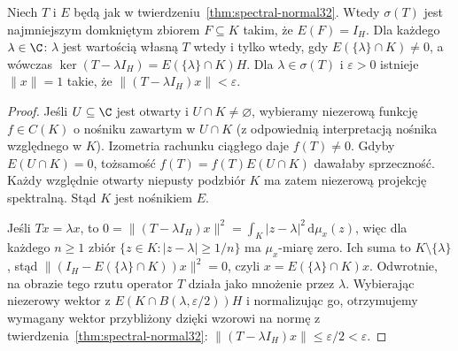\begin{twierdzenie}
\label{thm:spectral-support32}
Niech $T$ i $E$ będą jak w twierdzeniu~\ref{thm:spectral-normal32}.
Wtedy $\sigma(T)$ jest najmniejszym domkniętym zbiorem
$F\subseteq K$ takim, że $E(F)=I_H$.
Dla każdego $\lambda\in\C$:
$\lambda$ jest wartością własną $T$ wtedy i tylko wtedy,
gdy $E(\{\lambda\}\cap K)\ne0$, a wówczas
$\ker(T-\lambda I_H)=E(\{\lambda\}\cap K)H$.
Dla $\lambda\in\sigma(T)$ i $\varepsilon>0$ istnieje
$\|x\|=1$ takie, że $\|(T-\lambda I_H)x\|<\varepsilon$.
\end{twierdzenie}
\begin{proof}
Jeśli $U\subseteq\C$ jest otwarty i $U\cap K\ne\varnothing$,
wybieramy niezerową funkcję $f\in C(K)$ o nośniku
zawartym w $U\cap K$ (z odpowiednią interpretacją
nośnika względnego w $K$).
Izometria rachunku ciągłego daje $f(T)\ne0$.
Gdyby $E(U\cap K)=0$, tożsamość
$f(T)=f(T)E(U\cap K)$ dawałaby sprzeczność.
Każdy względnie otwarty niepusty podzbiór $K$
ma zatem niezerową projekcję spektralną. Stąd
$K$ jest nośnikiem $E$.

Jeśli $Tx=\lambda x$, to
$0=\|(T-\lambda I_H)x\|^2
=\int_K|z-\lambda|^2\,\mathrm d\mu_x(z)$,
więc dla każdego $n\ge1$ zbiór
$\{z\in K:|z-\lambda|\ge1/n\}$ ma $\mu_x$-miarę zero.
Ich suma to $K\setminus\{\lambda\}$, stąd
$\|(I_H-E(\{\lambda\}\cap K))x\|^2=0$,
czyli $x=E(\{\lambda\}\cap K)x$.
Odwrotnie, na obrazie tego rzutu operator $T$ działa
jako mnożenie przez $\lambda$.
Wybierając niezerowy wektor z
$E(K\cap B(\lambda,\varepsilon/2))H$ i normalizując go,
otrzymujemy wymagany wektor przybliżony dzięki wzorowi
na normę z twierdzenia~\ref{thm:spectral-normal32}:
$\|(T-\lambda I_H)x\|\le\varepsilon/2<\varepsilon$.
\end{proof}

